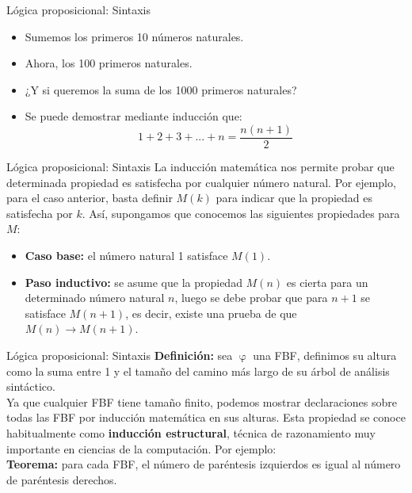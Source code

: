 \documentclass{beamer}
\begin{document}
\begin{frame}{Lógica proposicional: Sintaxis}
  \begin{itemize}[<+->]
    \item Sumemos los primeros 10 números naturales.
    \item Ahora, los 100 primeros naturales.
    \item ¿Y si queremos la suma de los 1000 primeros naturales?
    \item Se puede demostrar mediante inducción que:
    $$1 + 2 + 3 + ... + n = \dfrac{n (n+1)}{2}$$
  \end{itemize}
\end{frame}


\begin{frame}{Lógica proposicional: Sintaxis}
  La inducción matemática nos permite probar que determinada propiedad es
  satisfecha por cualquier número natural. Por ejemplo, para el caso anterior,
  basta definir $M(k)$ para indicar que la propiedad es satisfecha por $k$. Así,
  supongamos que conocemos las siguientes propiedades para $M$:\\

  \begin{itemize}
    \item \textbf{Caso base:} el número natural 1 satisface $M(1)$.
    \item \textbf{Paso inductivo:} se asume que la propiedad $M(n)$ es cierta
          para un determinado número natural $n$, luego se debe probar que para
          $n+1$ se satisface $M(n+1)$, es decir, existe una prueba de que $M(n) \rightarrow M(n+1)$.
  \end{itemize}
\end{frame}


\begin{frame}{Lógica proposicional: Sintaxis}
  \textbf{Definición:} sea $\upvarphi$ una FBF, definimos su altura como la suma
  entre 1 y el tamaño del camino más largo de su árbol de análisis sintáctico.\\

  Ya que cualquier FBF tiene tamaño finito, podemos mostrar declaraciones sobre
  todas las FBF por inducción matemática en sus alturas. Esta propiedad se
  conoce habitualmente como \textbf{inducción estructural}, técnica de
  razonamiento muy importante en ciencias de la computación. Por ejemplo:\\

  \textbf{Teorema:} para cada FBF, el número de paréntesis izquierdos es igual al número de paréntesis derechos.
\end{frame}
\end{document}
